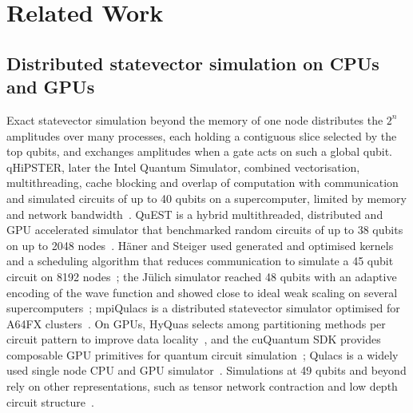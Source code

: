 \section{Related Work}\label{sec:related}

\subsection{Distributed statevector simulation on CPUs and GPUs}\label{subsec:related-dist}

Exact statevector simulation beyond the memory of one node distributes the $2^n$ amplitudes over many processes,
each holding a contiguous slice selected by the top qubits, and exchanges amplitudes when a gate acts on such a global
qubit. qHiPSTER, later the Intel Quantum Simulator, combined vectorisation, multithreading, cache blocking and
overlap of computation with communication and simulated circuits of up to 40 qubits on a supercomputer, limited by
memory and network bandwidth~\cite{smelyanskiy2016qhipster,guerreschi2020intel}. QuEST is a hybrid multithreaded,
distributed and GPU accelerated simulator that benchmarked random circuits of up to 38 qubits on up to 2048 nodes~\cite{jones2019quest}.
H\"aner and Steiger used generated and optimised kernels and a scheduling algorithm that reduces communication to
simulate a 45 qubit circuit on 8192 nodes~\cite{haner2017petabyte}; the J\"ulich simulator reached 48 qubits with an
adaptive encoding of the wave function and showed close to ideal weak scaling on several supercomputers~\cite{deraedt2019massively};
mpiQulacs is a distributed statevector simulator optimised for A64FX clusters~\cite{imamura2022mpiqulacs}. On GPUs,
HyQuas selects among partitioning methods per circuit pattern to improve data locality~\cite{zhang2021hyquas}, and the
cuQuantum SDK provides composable GPU primitives for quantum circuit simulation~\cite{bayraktar2023cuquantum};
Qulacs is a widely used single node CPU and GPU simulator~\cite{suzuki2021qulacs}. Simulations at 49 qubits and beyond
rely on other representations, such as tensor network contraction and low depth circuit
structure~\cite{markov2008simulating,pednault2017breaking,chen2018sixtyfour,boixo2018characterizing,villalonga2019flexible}.

